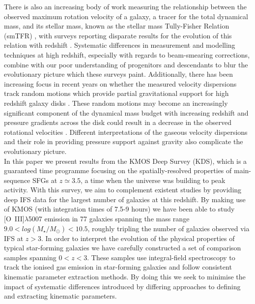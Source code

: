 \documentclass[fleqn,usenatbib]{mnras}
\begin{document}
There is also an increasing body of work measuring the relationship between the observed maximum rotation velocity of a galaxy, a tracer for the total dynamical mass, and its stellar mass, known as the stellar mass Tully-Fisher Relation (smTFR) \citep{Tully1977}, with surveys reporting disparate results for the evolution of this relation with redshift \citep[e.g.][]{Puech2008,Miller2011,Gnerucci2011,Swinbank2012,Simons2016,Tiley2016,Harrison2017,Straatman2017,Ubler2017}.
Systematic differences in measurement and modelling techniques at high redshift, especially with regards to beam-smearing corrections, combine with our poor understanding of progenitors and descendants to blur the evolutionary picture which these surveys paint.
Additionally, there has been increasing focus in recent years on whether the measured velocity dispersions track random motions which provide partial gravitational support for high redshift galaxy disks \citep[e.g.][]{Burkert2010,Wuyts2016b,Ubler2017,Genzel2017,Lang2017}.
These random motions may become an increasingly significant component of the dynamical mass budget with increasing redshift \citep{Wuyts2016b} and pressure gradients across the disk could result in a decrease in the observed rotational velocities \citep{Burkert2010}. 
Different interpretations of the gaseous velocity dispersions and their role in providing pressure support against gravity also complicate the evolutionary picture. \\

In this paper we present results from the KMOS Deep Survey (KDS), which is a guaranteed time programme focusing on the spatially-resolved properties of main-sequence SFGs at $z\simeq3.5$, a time when the universe was building to peak activity.
With this survey, we aim to complement existent studies by providing deep IFS data for the largest number of galaxies at this redshift.
By making use of KMOS (with integration times of 7.5-9 hours) we have been able to study [O~{\sc III}]$\lambda$5007 emission in 77 galaxies spanning the mass range $9.0 < log(M_{\star}/M_{\odot}) < 10.5$, roughly tripling the number of galaxies observed via IFS at $z > 3$.
In order to interpret the evolution of the physical properties of typical star-forming galaxies we have carefully constructed a set of comparison samples spanning $0 < z < 3$.
These samples use integral-field spectroscopy to track the ionised gas emission in star-forming galaxies and follow consistent kinematic parameter extraction methods.  
By doing this we seek to minimise the impact of systematic differences introduced by differing approaches to defining and extracting kinematic parameters.
\end{document}
